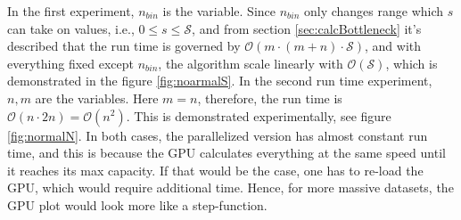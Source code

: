 \documentclass[a4paper]{article}
\begin{document}
\FloatBarrier
In the first experiment, $n_{bin}$ is the variable. Since $n_{bin}$ only changes range which $s$ can take on values, i.e., $0 \leq s \leq \mathcal{S}$, and from section \ref{sec:calcBottleneck} it's described that the run time is governed by $\mathcal{O}(m\cdot (m+n)\cdot \mathcal{S})$, and with everything fixed except $n_{bin}$, the algorithm scale linearly with $\mathcal{O}(\mathcal{S})$, which is demonstrated in the figure \ref{fig:noarmalS}.
In the second run time experiment, $n,m$ are the variables. Here $m=n$, therefore, the run time is $\mathcal{O}(n \cdot 2n)=\mathcal{O}(n^{2})$. This is demonstrated experimentally, see figure \ref{fig:normalN}.
In both cases, the parallelized version has almost constant run time, and this is because the GPU calculates everything at the same speed until it reaches its max capacity. If that would be the case, one has to re-load the GPU, which would require additional time. Hence, for more massive datasets, the GPU plot would look more like a step-function. 
\end{document}
